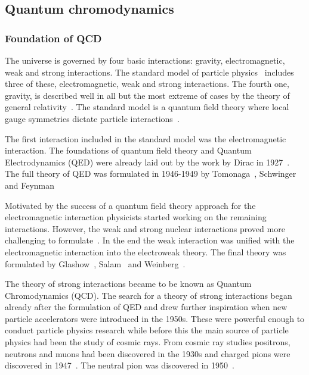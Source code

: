 \pagebreak
\subsection{Quantum chromodynamics}
\subsubsection{Foundation of QCD}
The universe is governed by four basic interactions: gravity, electromagnetic, weak and strong interactions. The standard model of particle physics~\cite{Tanabashi:2018oca} includes three of these, electromagnetic, weak and strong interactions.  The fourth one, gravity, is described well in all but the most extreme of cases by the theory of general relativity~\cite{Einstein1915}. The standard model is a quantum field theory where local gauge symmetries dictate  particle interactions~\cite{Perkins:1982xb}. 

The first interaction included in the standard model was the electromagnetic interaction. The foundations of quantum field theory and Quantum Electrodynamics (QED) were already laid out by the work by Dirac in 1927~\cite{doi:10.1098/rspa.1927.0039}. The full theory of QED was formulated in 1946-1949 by Tomonaga~\cite{Tomonaga:1946zz},  Schwinger~\cite{Schwinger:1948yj,Schwinger:1948yk} and Feynman~\cite{Feynman:1948fi}%

Motivated by the success of a quantum field theory approach for the electromagnetic interaction physicists started working on the remaining interactions. However, the weak and strong nuclear interactions proved more challenging to formulate~\cite{Krauss:2017}. In the end the weak interaction was unified with the electromagnetic interaction into the electroweak theory. The final theory was formulated by Glashow~\cite{Glashow:1970gm}, Salam~\cite{Salam:1964ry} and Weinberg~\cite{Weinberg:1967tq}.

The theory of strong interactions became to be known as Quantum Chromodynamics (QCD). The search for a theory of strong interactions began already after the formulation of QED and drew further inspiration when new particle accelerators were introduced in the 1950s. These were powerful enough to conduct particle physics research while before this the main source of particle physics had been the study of cosmic rays. From cosmic ray studies positrons, neutrons and muons had been discovered in the 1930s and charged pions were discovered in 1947~\cite{Occhialini:1987nr,Lattes:1947mx}. The neutral pion was discovered in 1950~\cite{Bjorklund:1950}.

